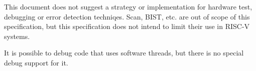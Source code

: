 This document does not suggest a strategy or implementation for hardware test,
debugging or error detection techniqes. Scan, BIST, etc. are out of scope of
this specification, but this specification does not intend to limit their use
in RISC-V systems.

It is possible to debug code that uses software threads, but there is no
special debug support for it.
